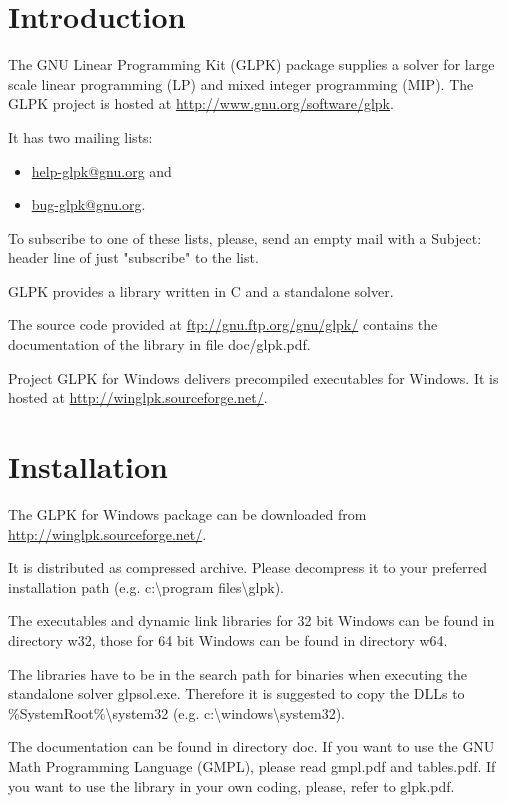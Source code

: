 \documentclass[a4paper,11pt]{report}
\begin{document}
\chapter{Introduction}
The GNU Linear Programming Kit (GLPK) package supplies a solver for large scale linear programming (LP) and mixed integer programming (MIP). The GLPK project is hosted at \href{http://www.gnu.org/software/glpk}{http://www.gnu.org/software/glpk}.

It has two mailing lists: 
\begin{itemize}
\item\href{mailto:help-glpk@gnu.org}{help-glpk@gnu.org} and 
\item\href{mailto:bug-glpk@gnu.org}{bug-glpk@gnu.org}.
\end{itemize}
To subscribe to one of these lists, please, send an empty mail with a Subject: header line of just "subscribe" to the list.

GLPK provides a library written in C and a standalone solver.

The source code provided at \href{ftp://gnu.ftp.org/gnu/glpk/}{ftp://gnu.ftp.org/gnu/glpk/} contains the documentation of the library in  file doc/glpk.pdf.

Project GLPK for Windows delivers precompiled executables for Windows. It is hosted at \href{http://winglpk.sourceforge.net/}{http://winglpk.sourceforge.net/}.

\chapter{Installation}
The GLPK for Windows package can be downloaded from \linebreak\href{http://winglpk.sourceforge.net/}{http://winglpk.sourceforge.net/}.

It is distributed as compressed archive. Please decompress it to your preferred installation path (e.g. c:\textbackslash program files\textbackslash glpk).

The executables and dynamic link libraries for 32 bit Windows can be found in directory w32, those for 64 bit Windows can be found in directory w64.

The libraries have to be in the search path for binaries when executing the standalone solver glpsol.exe. Therefore it is suggested to copy the DLLs to \%SystemRoot\%\textbackslash system32 (e.g. c:\textbackslash windows\textbackslash system32).

The documentation can be found in directory doc. If you want to use the GNU Math Programming Language (GMPL), please read gmpl.pdf and tables.pdf. If you want to use the library in your own coding, please, refer to glpk.pdf.
\end{document}
